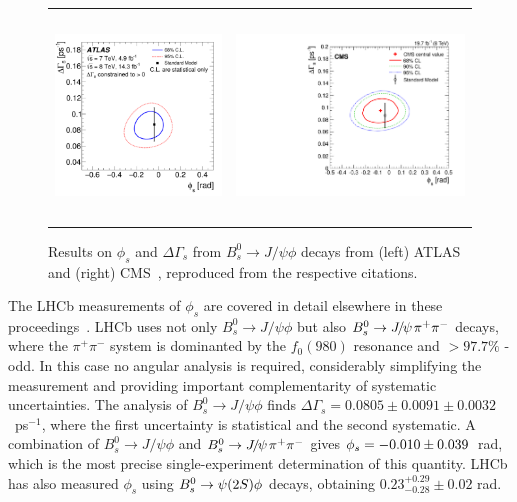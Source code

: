 \begin{figure}
  \begin{center}
    \begin{tabular}{c c}
      \includegraphics[height=5.5cm]{figs/atlas_phis_result.pdf} &
      \includegraphics[height=5.5cm]{figs/cms_phis_result.pdf} 
    \end{tabular}
  \end{center}
  \vspace{-0.5cm}
  \caption{\label{phis_atlas_cms}Results on $\phi_s$ and $\Delta\Gamma_s$ from
  $B^0_s \to J/\psi \phi$ decays from (left) ATLAS~\cite{atlas_phis_8TeV} and (right) CMS~\cite{cms_phis}, reproduced from the respective citations.}
\end{figure}

The LHCb measurements of $\phi_s$ are covered in detail elsewhere in these proceedings~\cite{LHCBPHISPROC}.
LHCb uses not only $B^0_s \to J/\psi \phi$ but also ${{B}^0_{s}}\rightarrow {\ensuremath{{J\mskip -3mu/\mskip -2mu\psi\mskip 2mu}}}\pi^+\pi^-$ decays,
where the $\pi^+\pi^-$ system is dominanted by the $f_0(980)$ resonance and $>97.7\%$ \CP-odd.
In this case no angular analysis is required, considerably simplifying the measurement
and providing important complementarity of systematic uncertainties.
The analysis of $B^0_s \to J/\psi \phi$ finds $\Delta\Gamma_s = 0.0805  \pm 0.0091         \pm  0.0032$~ps$^{-1}$,
where the first uncertainty is statistical and the second systematic. 
A combination of $B^0_s \to J/\psi \phi$ and ${{B}^0_{s}}\rightarrow {\ensuremath{{J\mskip -3mu/\mskip -2mu\psi\mskip 2mu}}}\pi^+\pi^-$ gives ${\phi_{{s}}} = -0.010  \pm  0.039$~rad, which is the most 
precise single-experiment determination of this quantity.
LHCb has also measured $\phi_s$ using ${{B}^0_{s}}\rightarrow \psi(2S)\phi$ decays, obtaining
$0.23^{+0.29}_{-0.28} \pm 0.02$ rad.

